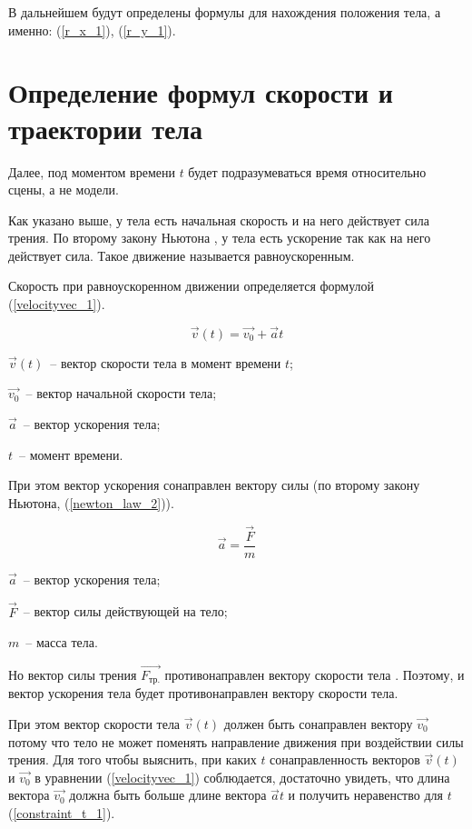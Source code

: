 В дальнейшем будут определены формулы для нахождения положения тела, а именно: (\ref{r_x_1}), (\ref{r_y_1}).

\section{Определение формул скорости и траектории тела}

Далее, под моментом времени \(t\) будет подразумеваться время относительно сцены, а не модели.

Как указано выше, у тела есть начальная скорость и на него действует сила трения.
По второму закону Ньютона \cite[с.~114]{rowellherbert}, у тела есть ускорение так как на него действует сила.
Такое движение называется равноускоренным.

Скорость при равноускоренном движении определяется формулой (\ref{velocityvec_1})\cite[с.~96]{rowellherbert}.

\begin{equation}\label{velocityvec_1}
  \vec{v}(t) = \vec{v_0} + \vec{a}t
\end{equation}

\begin{Underequation}
  \(\vec{v}(t)\)~-- вектор скорости тела в момент времени \(t\);

  \(\vec{v_0}\)~-- вектор начальной скорости тела;

  \(\vec{a}\)~-- вектор ускорения тела;

  \(t\)~-- момент времени.
\end{Underequation}

При этом вектор ускорения сонаправлен вектору силы (по второму закону Ньютона, (\ref{newton_law_2})).

\begin{equation}\label{newton_law_2}
  \vec{a} = \frac{\vec{F}}{m}
\end{equation}

\begin{Underequation}
  \(\vec{a}\)~-- вектор ускорения тела;

  \(\vec{F}\)~-- вектор силы действующей на тело;

  \(m\)~-- масса тела.
\end{Underequation}

Но вектор силы трения \(\vec{F_{\text{тр.}}}\) противонаправлен вектору скорости тела \cite[с. 21]{rowellherbert}.
Поэтому, и вектор ускорения тела будет противонаправлен вектору скорости тела.

При этом вектор скорости тела \(\vec{v}(t)\) должен быть сонаправлен вектору \(\vec{v_0}\)
потому что тело не может поменять направление движения при воздействии силы трения.
Для того чтобы выяснить, при каких \(t\) сонаправленность векторов \(\vec{v}(t)\) и \(\vec{v_0}\)
в уравнении (\ref{velocityvec_1}) соблюдается,
достаточно увидеть, что длина вектора \(\vec{v_0}\) должна быть больше длине вектора \(\vec{a}t\)
и получить неравенство для \(t\) (\ref{constraint_t_1}).

